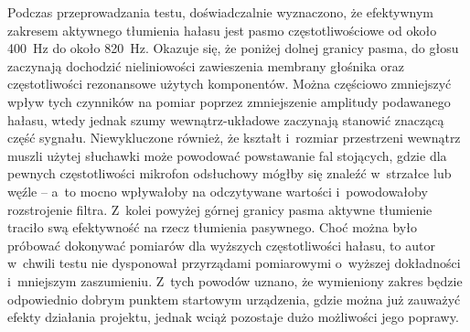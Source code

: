 Podczas przeprowadzania testu, doświadczalnie wyznaczono, że efektywnym zakresem aktywnego tłumienia hałasu jest pasmo częstotliwościowe od około \SI{400}{\Hz} do około \SI{820}{\Hz}. Okazuje się, że poniżej dolnej granicy pasma, do głosu zaczynają dochodzić nieliniowości zawieszenia membrany głośnika oraz częstotliwości rezonansowe użytych komponentów. Można częściowo zmniejszyć wpływ tych czynników na pomiar poprzez zmniejszenie amplitudy podawanego hałasu, wtedy jednak szumy wewnątrz-układowe zaczynają stanowić znaczącą część sygnału. Niewykluczone również, że kształt i~rozmiar przestrzeni wewnątrz muszli użytej słuchawki może powodować powstawanie fal stojących, gdzie dla pewnych częstotliwości mikrofon odsłuchowy mógłby się znaleźć w~strzałce lub węźle --  a~to mocno wpływałoby na odczytywane wartości i~powodowałoby rozstrojenie filtra. Z~kolei powyżej górnej granicy pasma aktywne tłumienie traciło swą efektywność na rzecz tłumienia pasywnego. Choć można było próbować dokonywać pomiarów dla wyższych częstotliwości hałasu, to autor w~chwili testu nie dysponował przyrządami pomiarowymi o~wyższej dokładności i~mniejszym zaszumieniu. Z~tych powodów uznano, że wymieniony zakres będzie odpowiednio dobrym punktem startowym urządzenia, gdzie można już zauważyć efekty działania projektu, jednak wciąż pozostaje dużo możliwości jego poprawy.

